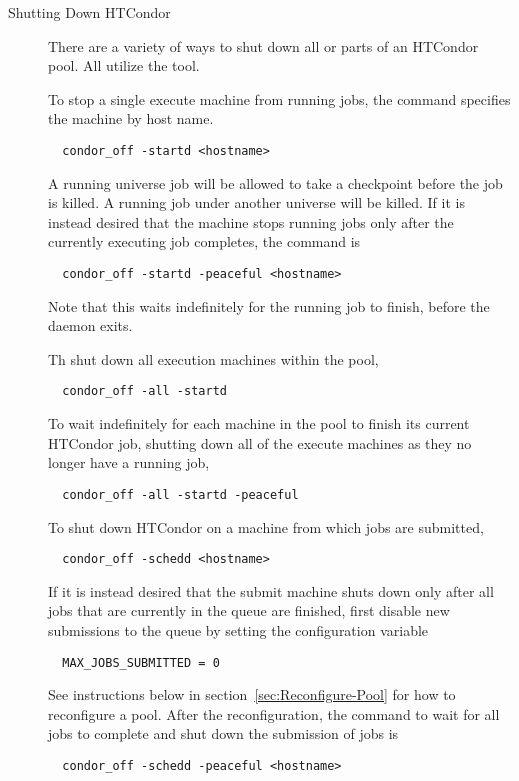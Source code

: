 \begin{description}
\item[Shutting Down HTCondor]
There are a variety of ways to shut down all or parts of an HTCondor pool.
All utilize the  tool.

To stop a single execute machine from running jobs,
the  command specifies the machine by host name.
\begin{verbatim}
  condor_off -startd <hostname>
\end{verbatim}
A running  universe job will be allowed to 
take a checkpoint before the job is killed.
A running job under another universe will be killed.
If it is instead desired that the machine stops running jobs
only after the currently executing job completes, the command is
\begin{verbatim}
  condor_off -startd -peaceful <hostname>
\end{verbatim}
Note that this waits indefinitely for the running job to finish,
before the  daemon exits.

Th shut down all execution machines within the pool,
\begin{verbatim}
  condor_off -all -startd
\end{verbatim}

To wait indefinitely for each machine in the pool to finish its current
HTCondor job,
shutting down all of the execute machines as they no longer
have a running job,
\begin{verbatim}
  condor_off -all -startd -peaceful
\end{verbatim}

To shut down HTCondor on a machine from which jobs are submitted,
\begin{verbatim}
  condor_off -schedd <hostname>
\end{verbatim}

If it is instead desired that the submit machine shuts down
only after all jobs that are currently in the queue are finished,
first disable new submissions to the queue 
by setting the configuration variable
\begin{verbatim}
  MAX_JOBS_SUBMITTED = 0
\end{verbatim}
See instructions below in section~\ref{sec:Reconfigure-Pool} for how
to reconfigure a pool.
After the reconfiguration, the command to wait for all jobs to complete
and shut down the submission of jobs is
\begin{verbatim}
  condor_off -schedd -peaceful <hostname>
\end{verbatim}


\end{description}
